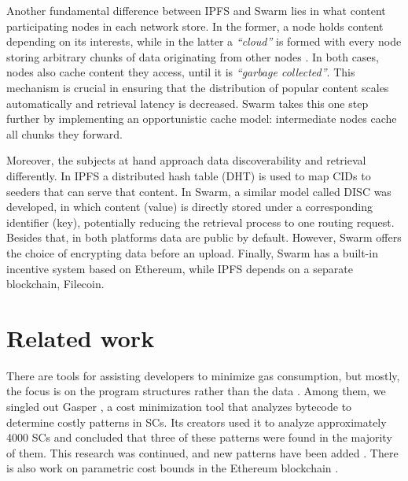 Another fundamental difference between IPFS and Swarm lies in what content participating nodes in each network store. In the former, a node holds content depending on its interests, while in the latter a \emph{``cloud''} is formed with every node storing arbitrary chunks of data originating from other nodes \citep{swarmwiki_2019}. In both cases, nodes also cache content they access, until it is \emph{``garbage collected''}. This mechanism is crucial in ensuring that the distribution of popular content scales automatically and retrieval latency is decreased. Swarm takes this one step further by implementing an opportunistic cache model: intermediate nodes cache all chunks they forward.

Moreover, the subjects at hand approach data discoverability and retrieval differently. In IPFS a distributed hash table (DHT) \citep{benet_2014} is used to map CIDs to seeders that can serve that content. In Swarm, a similar model called DISC  \citep{tron_2020} was developed, in which content (value) is directly stored under a corresponding identifier (key), potentially reducing the retrieval process to one routing request. Besides that, in both platforms data are public by default. However, Swarm offers the choice of encrypting data before an upload. Finally, Swarm has a built-in incentive system based on Ethereum, while IPFS depends on a separate blockchain, Filecoin. 

\section{Related work}\label{sec:related_work}
There are tools for assisting developers to minimize gas consumption, but mostly, the focus is on the program structures rather than the data  \citep{nelaturu_2021, chen_2017, chen_2021}. Among them, we singled out Gasper  \citep{chen_2017}, a cost minimization tool that analyzes bytecode to determine costly patterns in SCs. Its creators used it to analyze approximately 4000 SCs and concluded that three of these patterns were found in the majority of them. This research was continued, and new patterns have been added  \citep{chen_2021}. There is also work on parametric cost bounds in the Ethereum blockchain \citep{albert_2021}.

